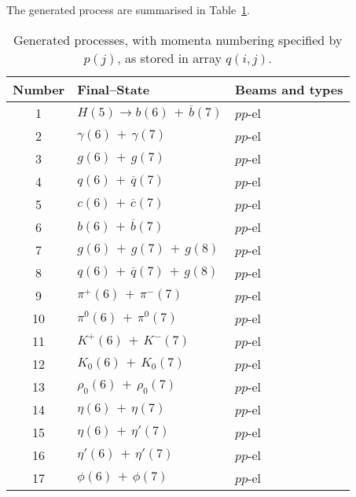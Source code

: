 \documentclass[12pt]{article}
\begin{document}
The generated process are summarised in Table~\ref{table:proc}.
\newpage
\begin{center}
\begin{table}[htbp!]\tiny
\renewcommand\arraystretch{1.0}
\caption{Generated processes, with momenta numbering specified by $p(j)$, as stored in array $q(i,j)$.}
\label{table:proc}
\begin{tabular}{|c|l|l|}\hline
Number&Final--State& Beams and types\\\hline\hline

1 &  $H(5) \to b(6)\,+\,\overline{b}(7)$ &  $pp$-el  \\

2 &  $\gamma(6)\,+\, \gamma(7)$ &  $pp$-el  \\

3 & $g(6)\,+\, g(7)$ &  $pp$-el  \\

4 & $q(6)\,+\, \overline{q}(7)$ &  $pp$-el  \\

5 & $c(6)\,+\, \overline{c}(7)$ &  $pp$-el  \\

6 & $b(6)\,+\, \overline{b}(7)$ &  $pp$-el  \\

7 & $g(6)\,+\, g(7)\,+\, g(8)$ &  $pp$-el  \\

8 & $q(6)\,+\, \overline{q}(7)\,+\, g(8)$ &  $pp$-el  \\

9 & $\pi^+(6)\,+\,\pi^-(7)$ &  $pp$-el  \\

10 & $ \pi^0(6)\,+\,\pi^0(7)$ &  $pp$-el  \\

11 & $K^+(6)\,+\,K^-(7)$ &  $pp$-el  \\

12 & $K_0(6)\,+\,K_0(7)$ &  $pp$-el  \\

13 & $\rho_0(6)\,+\,\rho_0(7)$ &  $pp$-el  \\

14 & $\eta(6)\,+\,\eta(7)$ &  $pp$-el  \\

15 & $\eta(6)\,+\,\eta'(7)$ &  $pp$-el  \\

16 & $\eta'(6)\,+\,\eta'(7)$ &  $pp$-el  \\

17 & $\phi(6)\,+\,\phi(7)$ &  $pp$-el  \\


\end{tabular}
\end{table}
\end{center}
\end{document}
